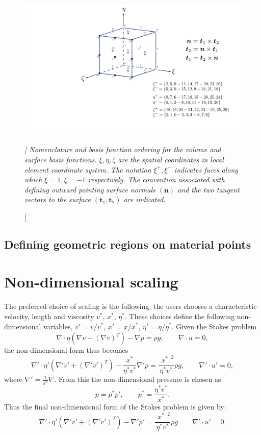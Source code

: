 \documentclass[paper=a4, fontsize=11pt,twoside]{scrartcl}
\begin{document}
{\begin{figure} [hbtp]
\center
\includegraphics[height=0.4\textheight]{figs/pt3d_basis_functions.pdf}
\caption[\itshape ]
{\itshape Nomenclature and basis function ordering for the volume and surface basis functions. $\xi, \eta, \zeta$ are the spatial coordinates in local element coordinate system. The notation $\xi^{+}, \xi^{-}$ indicates faces along which $\xi = 1, \xi = -1$ respectively. The convention associated with defining outward pointing surface normals $(\boldsymbol n)$ and the two tangent vectors to the surface $(\boldsymbol t_1,\boldsymbol t_2)$ are indicated.}
\label{fig:basis_functions}
\end{figure}

\subsection{Defining geometric regions on material points}

\section{Non-dimensional scaling}
The preferred choice of scaling is the following; the users chooses a characteristic velocity, length and viscosity $v^*$, $x^*$, $\eta^*$.
These choices define the following non-dimensional variables, $v' = v/v^*$, $x' = x/x^*$, $\eta' = \eta/\eta^*$. Given the Stokes problem
$$
	\nabla \cdot \eta \left( \nabla v + (\nabla v)^T \right) - \nabla p = \rho g,
	\qquad
	\nabla \cdot u = 0,
$$
the non-dimensional form thus becomes
$$
	\nabla' \cdot \eta' \left( \nabla' v' + (\nabla' v')^T \right) - \frac{x^*}{\eta^* v^*} \nabla' p = \frac{\phantom(x^*\phantom)^2}{\eta^* v^*} \rho g,
	\qquad
	\nabla' \cdot u' = 0,
$$
where $\nabla' = \frac{1}{x^*} \nabla$.
From this the non-dimensional pressure is chosen as 
$$
	p = p^* p', \qquad p^* = \frac{\eta^* v^*}{x^*} .
$$
Thus the final non-dimensional form of the Stokes problem is given by:
$$
	\nabla' \cdot \eta' \left( \nabla' v' + (\nabla' v')^T \right) - \nabla' p' 
	= \frac{\phantom(x^*\phantom)^2}{\eta^* v^*} \rho g
	\qquad
	\nabla' \cdot u' = 0.
$$

}
\end{document}
